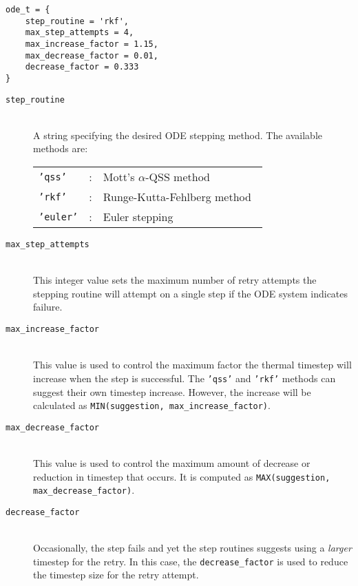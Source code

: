 \begin{verbatim}
ode_t = {
    step_routine = 'rkf',
    max_step_attempts = 4,
    max_increase_factor = 1.15,
    max_decrease_factor = 0.01,
    decrease_factor = 0.333
}
\end{verbatim}

\begin{description}
 \item[\texttt{step\_routine}] \hspace{1cm} \\
 A string specifying the desired ODE stepping method.
 The available methods are:
   \begin{tabular}{lll}
    \texttt{'qss'} & : & Mott's $\alpha$-QSS method~\cite{mott_99a} \\
    \texttt{'rkf'} & : & Runge-Kutta-Fehlberg method~\cite{fehlberg_69a} \\
    \texttt{'euler'} & : & Euler stepping \\
   \end{tabular}
\item[\texttt{max\_step\_attempts}] \hspace{1cm} \\
    This integer value sets the maximum number of retry attempts the stepping
    routine will attempt on a single step if the ODE system indicates failure.
\item[\texttt{max\_increase\_factor}] \hspace{1cm} \\
    This value is used to control the maximum factor the thermal timestep
    will increase when the step is successful.  The \texttt{'qss'} and \texttt{'rkf'}
    methods can suggest their own timestep increase. However, the increase will
    be calculated as \texttt{MIN(suggestion, max\_increase\_factor)}.
\item[\texttt{max\_decrease\_factor}] \hspace{1cm} \\
    This value is used to control the maximum amount of decrease or reduction
    in timestep that occurs.  It is computed as \texttt{MAX(suggestion, max\_decrease\_factor)}.
\item[\texttt{decrease\_factor}] \hspace{1cm} \\
    Occasionally, the step fails and yet the step routines suggests using a \emph{larger}
    timestep for the retry.  In this case, the \texttt{decrease\_factor} is used to reduce
    the timestep size for the retry attempt.
\end{description}


